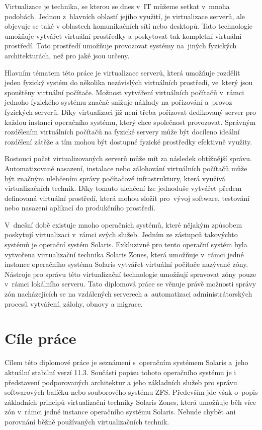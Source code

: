 \label{chapter:introduction}
Virtualizace je technika, se kterou se dnes v~IT můžeme setkat v~mnoha podobách. Jednou z~hlavních oblastí jejího využití,
je virtualizace serverů, ale objevuje se také v oblastech komunikačních sítí nebo desktopů. Tato technologie umožňuje vytvářet
virtuální prostředky a poskytovat tak kompletní virtuální prostředí. Toto prostředí umožňuje provozovat systémy na~jiných
fyzických architekturách, než pro jaké jsou určeny.

Hlavním tématem této práce je virtualizace serverů, která umožňuje rozdělit jeden fyzický systém do několika nezávislých virtuálních
prostředí, ve~který jsou spouštěny virtuální počítače. Možnost vytváření virtuálních počítačů v~rámci jednoho fyzického systému
značně snižuje náklady na pořizování a~provoz fyzických serverů. Díky virtualizaci již není třeba pořizovat dedikovaný server pro
každou instanci operačního systému, který chce společnost provozovat. Správným rozdělením virtuálních počítačů na fyzické servery může být
docíleno ideální rozdělení zátěže a tím mohou být dostupné fyzické prostředky efektivně využity.

Rostoucí počet virtualizovaných serverů může mít za následek obtížnější správu. Automatizované nasazení, instalace nebo
zálohování virtuálních počítačů může být značným ulehčením správy počítačové infrastruktury, která využívá virtualizačních technik.
Díky tomuto ulehčení lze jednoduše vytvářet předem definovaná virtuální prostředí, která mohou složit pro~vývoj software, testování
nebo nasazení aplikací do produkčního prostředí. 

V~dnešní době existuje mnoho operačních systémů, které nějakým způsobem poskytují virtualizaci v~rámci svých služeb. Jedním ze zástupců
takovýchto systémů je operační systém Solaris. Exkluzivně pro tento operační systém byla vytvořena virtualizační technika Solaris
Zones, která umožňuje v~rámci jedné instance operačního systému Solaris vytvářet virtuální počítače nazývané zóny. Nástroje pro správu
této virtualizační technologie umožňují spravovat zóny pouze v~rámci lokálního serveru. Tato diplomová práce se věnuje právě možnosti
správy zón nacházejících se na vzdálených serverech a~automatizaci administrátorských procesů vytváření, zálohy, obnovy a migrace.
\section{Cíle práce}
\label{chapter:introduction:goals}
Cílem této diplomové práce je seznámení s~operačním systémem Solaris a~jeho aktuální stabilní verzí 11.3. Součástí popisu tohoto
operačního systému je i představení podporovaných architektur a jeho základních služeb pro správu softwarových balíčku nebo souborového
systému ZFS. Především jde však o~popis základních principů virtualizační techniky Solaris Zones, která umožňuje běh více zón v~rámci 
jedné instance operačního systému Solaris. Nebude chybět ani porovnání běžně používaných virtualizačních technik.

